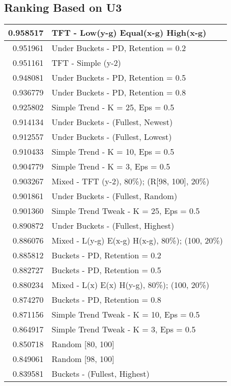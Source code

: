 \begin{table}[!hbtp]
\subsection{Ranking Based on U3}
\begin{footnotesize}
\begin{tabular}{|r|l|}\hline  \label{U3results}
0.958517 & TFT - Low(y-g) Equal(x-g) High(x-g)\\ \hline
0.951961 & Under Buckets - PD, Retention = 0.2\\ \hline
0.951161 & TFT - Simple (y-2)\\ \hline
0.948081 & Under Buckets - PD, Retention = 0.5\\ \hline
0.936779 & Under Buckets - PD, Retention = 0.8\\ \hline
0.925802 & Simple Trend - K = 25, Eps = 0.5\\ \hline
0.914134 & Under Buckets - (Fullest, Newest)\\ \hline
0.912557 & Under Buckets - (Fullest, Lowest)\\ \hline
0.910433 & Simple Trend - K = 10, Eps = 0.5\\ \hline
0.904779 & Simple Trend - K = 3, Eps = 0.5\\ \hline
0.903267 & Mixed - {TFT (y-2), 80\%); (R[98, 100], 20\%)}\\ \hline
0.901861 & Under Buckets - (Fullest, Random)\\ \hline
0.901360 & Simple Trend Tweak - K = 25, Eps = 0.5\\ \hline
0.890872 & Under Buckets - (Fullest, Highest)\\ \hline
0.886076 & Mixed - {L(y-g) E(x-g) H(x-g), 80\%); (100, 20\%)}\\ \hline
0.885812 & Buckets - PD, Retention = 0.2\\ \hline
0.882727 & Buckets - PD, Retention = 0.5\\ \hline
0.880234 & Mixed - {L(x) E(x) H(y-g), 80\%); (100, 20\%)}\\ \hline
0.874270 & Buckets - PD, Retention = 0.8\\ \hline
0.871156 & Simple Trend Tweak - K = 10, Eps = 0.5\\ \hline
0.864917 & Simple Trend Tweak - K = 3, Eps = 0.5\\ \hline
0.850718 & Random [80, 100]\\ \hline
0.849061 & Random [98, 100]\\ \hline
0.839581 & Buckets - (Fullest, Highest)\\ \hline

\end{tabular}
\end{footnotesize}
\end{table}
